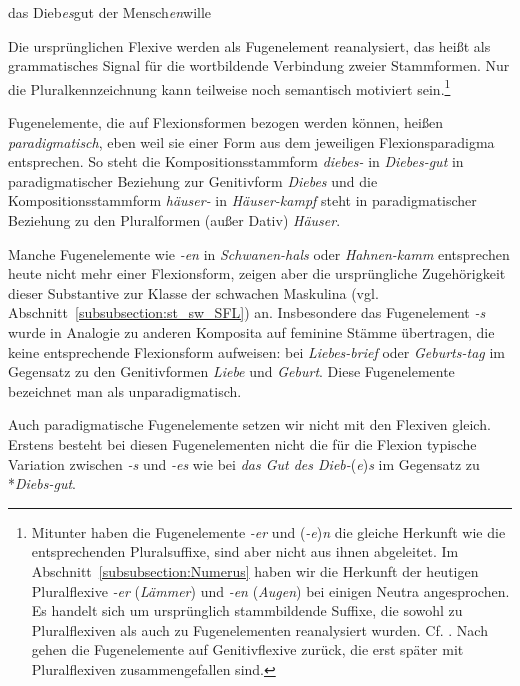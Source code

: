 \ea \label{ea:FE_Genitiv}
\ea \label{ea:FE_Gen_Sgl} das Dieb\textit{es}gut
\ex \label{ex:FE_Gen_Pl} der Mensch\textit{en}wille
\z 
\z 

Die ursprünglichen Flexive werden als Fugenelement reanalysiert, das heißt als grammatisches Signal für die wortbildende Verbindung zweier Stammformen. Nur die Pluralkennzeichnung kann teilweise noch semantisch motiviert sein.\footnote{Mitunter haben die Fugenelemente \textit{-er} und (\textit{-e})\textit{n} die gleiche Herkunft wie die entsprechenden Pluralsuffixe, sind aber nicht aus ihnen abgeleitet. Im Abschnitt~\ref{subsubsection:Numerus} haben wir die Herkunft der heutigen Pluralflexive \textit{-er} (\textit{Lämmer}) und \textit{-en} (\textit{Augen}) bei einigen Neutra angesprochen. Es handelt sich um ursprünglich stammbildende Suffixe, die sowohl zu Pluralflexiven als auch zu Fugenelementen reanalysiert wurden. Cf. \citet[175--176]{Wegener2005}. Nach \citet[6, 10--12]{Paul1920Wb} gehen die Fugenelemente auf Genitivflexive zurück, die erst später mit Pluralflexiven zusammengefallen sind.}

Fugenelemente, die auf Flexionsformen bezogen werden können, heißen \textit{paradigmatisch}, eben weil sie einer Form aus dem jeweiligen Flexionsparadigma entsprechen. So steht die Kompositionsstammform \textit{diebes-} in \textit{Diebes-gut} in paradigmatischer Beziehung zur Genitivform \textit{Diebes} und die Kompositionsstammform \textit{häuser-} in \textit{Häuser-kampf} steht in paradigmatischer Beziehung zu den Pluralformen (außer Dativ) \textit{Häuser}. 

Manche Fugenelemente wie \textit{-en} in \textit{Schwanen-hals} oder \textit{Hahnen-kamm} entsprechen heute nicht mehr einer Flexionsform, zeigen aber die ursprüngliche Zugehörigkeit dieser Substantive zur Klasse der schwachen Maskulina (vgl. Abschnitt~\ref{subsubsection:st_sw_SFL}) an. Insbesondere das Fugenelement \textit{-s} wurde in Analogie zu anderen Komposita auf feminine Stämme übertragen, die keine entsprechende Flexionsform aufweisen: \zB bei \textit{Liebes-brief} oder \textit{Geburts-tag} im Gegensatz zu den Genitivformen \textit{Liebe} und \textit{Geburt}. Diese Fugenelemente bezeichnet man als unparadigmatisch.

Auch paradigmatische Fugenelemente setzen wir nicht mit den Flexiven gleich. Erstens besteht bei diesen Fugenelementen nicht die für die Flexion typische Variation zwischen \textit{-s} und \textit{-es} wie bei \textit{das Gut des Dieb-}(\textit{e})\textit{s} im Gegensatz zu *\textit{Diebs-gut}. 


